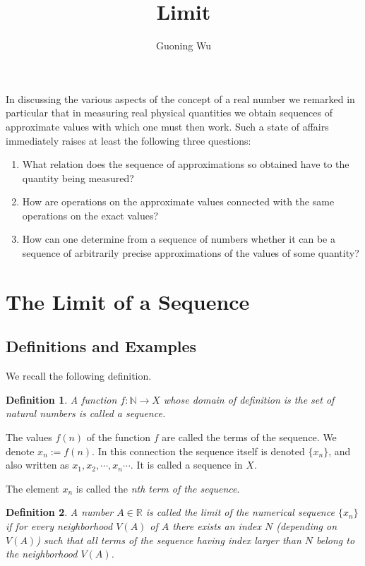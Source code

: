\documentclass[a4paper,12pt]{article} %
\title{Limit}
\author{Guoning Wu}
\newtheorem{definition}{Definition}[section]
\begin{document}
\tableofcontents
\setcounter{tocdepth}{2}
\listoffigures
\listoftables
\maketitle
In discussing the various aspects of the concept of a real number we 
remarked in particular that in measuring real physical quantities 
we obtain sequences of approximate values with which one must then 
work. Such a state of affairs immediately raises at least the following 
three questions:
\begin{enumerate}
    \item What relation does the sequence of approximations so obtained 
        have to the quantity being measured?
    \item How are operations on the approximate values connected with the 
        same operations on the exact values?
    \item How can one determine from a sequence of numbers whether it can
        be a sequence of arbitrarily precise approximations of the values 
        of some quantity?
\end{enumerate}

\section{The Limit of a Sequence}
\subsection{Definitions and Examples}
We recall the following definition.
\begin{definition}
    A function $f: \mathbb{N} \to X$ whose domain of definition is the set of 
    natural numbers is called a \textit{sequence}.
\end{definition}

The values $f(n)$ of the function $f$ are called the terms of the sequence. We 
denote $x_n  := f(n)$. In this connection the sequence itself is denoted $\{x_n\}$,
and also written as $x_1, x_2, \cdots , x_n \cdots $. It is called a sequence in $X$.

The element $x_n$ is called the \textit{nth term of the sequence}.

\begin{definition}
    A number $A \in \mathbb{R}$ is called the \textit{limit of the numerical sequence}
     $\{x_n\}$ if for every neighborhood $V(A)$ of $A$ there exists an index $N$
    (depending on $V(A)$) such that all terms of the sequence having index larger 
    than $N$ belong to the neighborhood $V(A)$.
\end{definition}
\end{document}
